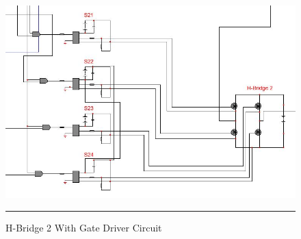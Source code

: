 \begin{figure}[htbp]
	\centering
	\includegraphics[width = 6in]{./Figures/C_2.JPG}
	\rule{35em}{1pt}
	\caption{H-Bridge 2 With Gate Driver Circuit}
	\label{fig:4}
\end{figure}